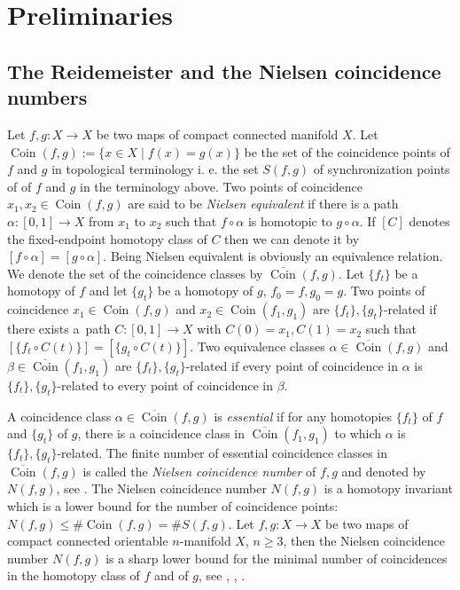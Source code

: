 \documentclass[oneside]{amsart}
\def\Coin{\operatorname{Coin}}
\begin{document}
\vspace{1cm}
\bigskip
\section{Preliminaries} \label{sec:preliminaries}


\subsection{The Reidemeister  and the Nielsen  coincidence numbers}

Let $f, g: X \to X$ be two maps of  compact connected manifold $X$.
Let
$\Coin(f,g) := \{ x \in X \mid f(x) = g(x) \}$ be the set of the coincidence  points of $f$ and $g$ in topological terminology   i. e. the
set $ S(f,g) $ of synchronization points of  of $f$ and $g$ in the  terminology above.
Two points of coincidence $x_1,x_2 \in \Coin(f,g)$ are said to be \emph{Nielsen equivalent} if there is a path
$\alpha:[0,1] \to X$ from $x_1$ to $x_2$ such that $f \circ \alpha$ is homotopic to $g \circ \alpha$.
If $[C]$ denotes the fixed-endpoint homotopy class of $C$
then we can denote it by $[f \circ \alpha] = [g \circ \alpha]$.
Being Nielsen equivalent is obviously an equivalence relation.
We denote the set of the coincidence classes by $\overline{\Coin}(f,g)$.
Let $\{f_t\}$ be a homotopy of $f$ and let $\{g_t\}$ be a homotopy of $g$, $f_0 = f, g_0 = g$.
Two points of coincidence $x_1 \in \Coin(f,g)$ and $x_2 \in \Coin(f_1, g_1)$ are $\{f_t\},\{g_t\}$-related
if there exists a~path $C:[0,1] \to X$ with $C(0) = x_1, C(1) = x_2$ such that
$[\{f_t \circ C(t)\}] = [\{g_t \circ C(t)\}]$.
Two equivalence classes $\alpha \in \overline{\Coin}(f,g)$ and $\beta \in \overline{\Coin}(f_1,g_1)$
are $\{f_t\},\{g_t\}$-related if every point of coincidence in $\alpha$ is $\{f_t\},\{g_t\}$-related
to every point of coincidence in $\beta$.

A coincidence class $\alpha \in \overline{\Coin}(f,g)$ is \emph{essential}
if for any homotopies $\{f_t\}$ of $f$ and $\{g_t\}$ of $g$, there is a coincidence class
in $\overline{\Coin}(f_1,g_1)$ to which $\alpha$ is $\{f_t\},\{g_t\}$-related.
The finite number of essential coincidence classes in $\overline{\Coin}(f,g)$ is called
the \emph{Nielsen coincidence number} of $f,g$ and denoted by $N(f,g)$,
see  \cite{ Wong}. The Nielsen coincidence number $N(f,g)$ is a homotopy invariant which is
a lower bound for the number of coincidence points: $N(f,g) \leq \#\Coin(f,g)=\#S(f,g)$.
Let $f, g: X \to X$ be two maps of  compact connected  orientable  $n$-manifold $X$, $n\geq 3$, then
the Nielsen coincidence number $N(f,g)$ is a sharp lower bound for the minimal number of coincidences in the homotopy class of $f$ and of $g$, see \cite{BrownSchirmer}, \cite{Je}, \cite{GoWon}.
\end{document}
